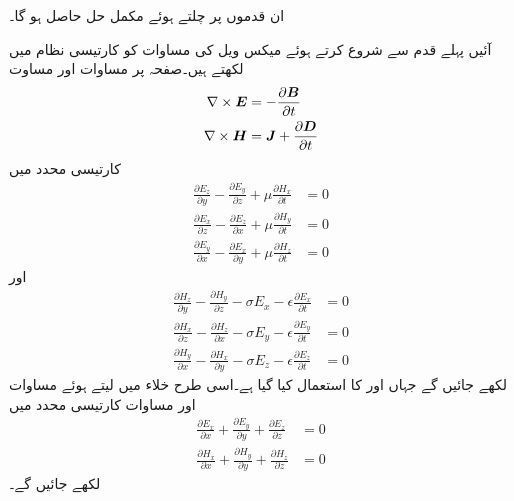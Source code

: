 ان قدموں پر چلتے ہوئے مکمل حل حاصل ہو گا۔

آئیں پہلے قدم سے شروع کرتے ہوئے میکس ویل کی مساوات کو کارتیسی نظام میں لکھتے ہیں۔صفحہ  پر مساوات  اور  مساوت 
\begin{align}\label{مساوات_مویج_مستطیلی_پہلا_قدم_شروع}
\nabla \times {\ensuremath{{\boldsymbol{E}}}}&=-\frac{\partial {\ensuremath{{\boldsymbol{B}}}}}{\partial t}\\
\nabla \times {\ensuremath{{\boldsymbol{H}}}}&={{\boldsymbol{J}}}+\frac{\partial {\ensuremath{{\boldsymbol{D}}}}}{\partial t}
\end{align}
کارتیسی محدد میں
\begin{align}
\frac{\partial E_z}{\partial y}-\frac{\partial E_y}{\partial z}+\mu \frac{\partial H_x}{\partial t}&=0  \label{مساوات_مویج_میکس_ویل_الف}\\
\frac{\partial E_x}{\partial z}-\frac{\partial E_z}{\partial x}+\mu \frac{\partial H_y}{\partial t}&=0   \label{مساوات_مویج_میکس_ویل_ب}\\
\frac{\partial E_y}{\partial x}-\frac{\partial E_x}{\partial y}+\mu \frac{\partial H_z}{\partial t}&=0 \label{مساوات_مویج_میکس_ویل_پ}
\end{align}
اور
\begin{align}
\frac{\partial H_z}{\partial y}-\frac{\partial H_y}{\partial z}-\sigma E_x-\epsilon \frac{\partial E_x}{\partial t}&=0  \label{مساوات_مویج_میکس_ویل_ت}\\
\frac{\partial H_x}{\partial z}-\frac{\partial H_z}{\partial x}-\sigma E_y-\epsilon \frac{\partial E_y}{\partial t}&=0  \label{مساوات_مویج_میکس_ویل_ٹ}\\
\frac{\partial H_y}{\partial x}-\frac{\partial H_x}{\partial y}-\sigma E_z-\epsilon \frac{\partial E_z}{\partial t}&=0 \label{مساوات_مویج_میکس_ویل_ث}
\end{align}
لکھے جائیں گے جہاں  اور  کا استعمال کیا گیا ہے۔اسی طرح خلاء میں  لیتے ہوئے  مساوات  اور مساوات  کارتیسی محدد میں
\begin{align}
\frac{\partial E_x}{\partial x}+\frac{\partial E_y}{\partial y}+\frac{\partial E_z}{\partial z}&=0 \label{مساوات_مویج_میکس_ویل_ج}\\
\frac{\partial H_x}{\partial x}+\frac{\partial H_y}{\partial y}+\frac{\partial H_z}{\partial z}&=0 \label{مساوات_مویج_میکس_ویل_چ}
\end{align}
لکھے جائیں گے۔

